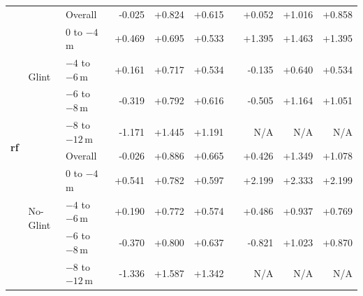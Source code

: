 \begin{table}[htbp]
{\begin{tabular}{lll rrr c rrr}
\multirow{10}{*}{\textbf{rf}} & \multirow{5}{*}{Glint} & Overall              &  -0.025 & +0.824 & +0.615 & &  +0.052 & +1.016 & +0.858 \\
                           &                      & $0$ to $-4$\,m       &  +0.469 & +0.695 & +0.533 & &  +1.395 & +1.463 & +1.395 \\
                           &                      & $-4$ to $-6$\,m      &  +0.161 & +0.717 & +0.534 & &  -0.135 & +0.640 & +0.534 \\
                           &                      & $-6$ to $-8$\,m      &  -0.319 & +0.792 & +0.616 & &  -0.505 & +1.164 & +1.051 \\
                           &                      & $-8$ to $-12$\,m     &  -1.171 & +1.445 & +1.191 & &     N/A &   N/A &   N/A \\
\cmidrule(lr){2-10}
                           & \multirow{5}{*}{No-Glint} & Overall              &  -0.026 & +0.886 & +0.665 & &  +0.426 & +1.349 & +1.078 \\
                           &                      & $0$ to $-4$\,m       &  +0.541 & +0.782 & +0.597 & &  +2.199 & +2.333 & +2.199 \\
                           &                      & $-4$ to $-6$\,m      &  +0.190 & +0.772 & +0.574 & &  +0.486 & +0.937 & +0.769 \\
                           &                      & $-6$ to $-8$\,m      &  -0.370 & +0.800 & +0.637 & &  -0.821 & +1.023 & +0.870 \\
                           &                      & $-8$ to $-12$\,m     &  -1.336 & +1.587 & +1.342 & &     N/A &   N/A &   N/A \\
\midrule


\end{tabular}}
\end{table}
